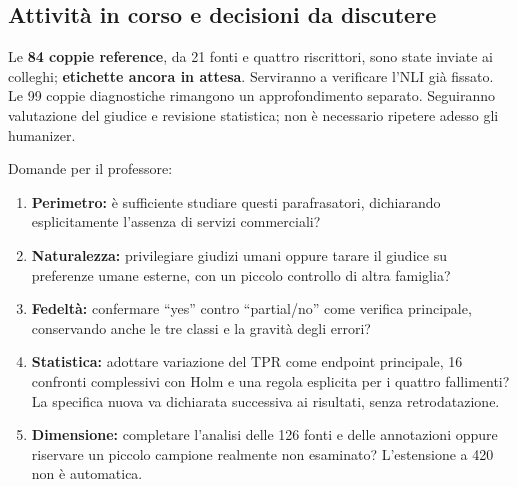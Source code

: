 \documentclass[10pt,a4paper]{article}
\providecommand{\tightlist}{\setlength{\itemsep}{1pt}\setlength{\parskip}{0pt}}
\begin{document}
\subsection{Attività in corso e decisioni da discutere}\label{attivituxe0-in-corso-e-decisioni-da-discutere}

Le \textbf{84 coppie reference}, da 21 fonti e quattro riscrittori, sono state inviate ai colleghi; \textbf{etichette ancora in attesa}. Serviranno a verificare l'NLI già fissato. Le 99 coppie diagnostiche rimangono un approfondimento separato. Seguiranno valutazione del giudice e revisione statistica; non è necessario ripetere adesso gli humanizer.

Domande per il professore:

\begin{enumerate}
\def\labelenumi{\arabic{enumi}.}
\tightlist
\item
  \textbf{Perimetro:} è sufficiente studiare questi parafrasatori, dichiarando esplicitamente l'assenza di servizi commerciali?
\item
  \textbf{Naturalezza:} privilegiare giudizi umani oppure tarare il giudice su preferenze umane esterne, con un piccolo controllo di altra famiglia?
\item
  \textbf{Fedeltà:} confermare ``yes'' contro ``partial/no'' come verifica principale, conservando anche le tre classi e la gravità degli errori?
\item
  \textbf{Statistica:} adottare variazione del TPR come endpoint principale, 16 confronti complessivi con Holm e una regola esplicita per i quattro fallimenti? La specifica nuova va dichiarata successiva ai risultati, senza retrodatazione.
\item
  \textbf{Dimensione:} completare l'analisi delle 126 fonti e delle annotazioni oppure riservare un piccolo campione realmente non esaminato? L'estensione a 420 non è automatica.
\end{enumerate}
\end{document}
